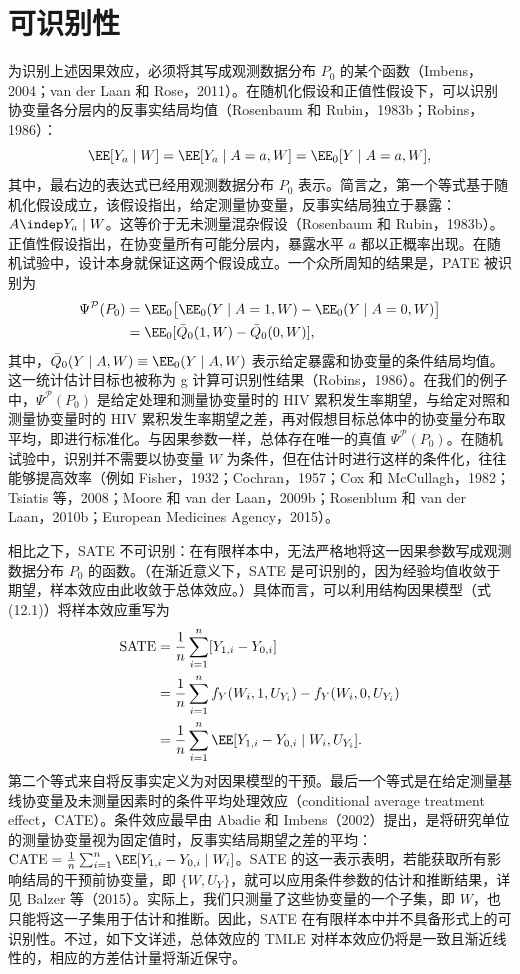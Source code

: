 \section{可识别性}

为识别上述因果效应，必须将其写成观测数据分布 $P_0$ 的某个函数（Imbens，2004；van der Laan 和 Rose，2011）。在随机化假设和正值性假设下，可以识别协变量各分层内的反事实结局均值（Rosenbaum 和 Rubin，1983b；Robins，1986）：
\[
\EE[Y_a\mid W]=\EE[Y_a\mid A=a,W]=\EE_0[Y\mid A=a,W],
\]
其中，最右边的表达式已经用观测数据分布 $P_0$ 表示。简言之，第一个等式基于随机化假设成立，该假设指出，给定测量协变量，反事实结局独立于暴露：$A\indep Y_a\mid W$。这等价于无未测量混杂假设（Rosenbaum 和 Rubin，1983b）。正值性假设指出，在协变量所有可能分层内，暴露水平 $a$ 都以正概率出现。在随机试验中，设计本身就保证这两个假设成立。一个众所周知的结果是，PATE 被识别为
\[
\begin{aligned}
\Psi^{\mathcal P}(P_0)
&=\EE_0\bigl[\EE_0(Y\mid A=1,W)-\EE_0(Y\mid A=0,W)\bigr]\\
&=\EE_0[\bar Q_0(1,W)-\bar Q_0(0,W)],
\end{aligned}
\]
其中，$\bar Q_0(Y\mid A,W)\equiv\EE_0(Y\mid A,W)$ 表示给定暴露和协变量的条件结局均值。这一统计估计目标也被称为 g 计算可识别性结果（Robins，1986）。在我们的例子中，$\Psi^{\mathcal P}(P_0)$ 是给定处理和测量协变量时的 HIV 累积发生率期望，与给定对照和测量协变量时的 HIV 累积发生率期望之差，再对假想目标总体中的协变量分布取平均，即进行标准化。与因果参数一样，总体存在唯一的真值 $\Psi^{\mathcal P}(P_0)$。在随机试验中，识别并不需要以协变量 $W$ 为条件，但在估计时进行这样的条件化，往往能够提高效率（例如 Fisher，1932；Cochran，1957；Cox 和 McCullagh，1982；Tsiatis 等，2008；Moore 和 van der Laan，2009b；Rosenblum 和 van der Laan，2010b；European Medicines Agency，2015）。

相比之下，SATE 不可识别：在有限样本中，无法严格地将这一因果参数写成观测数据分布 $P_0$ 的函数。（在渐近意义下，SATE 是可识别的，因为经验均值收敛于期望，样本效应由此收敛于总体效应。）具体而言，可以利用结构因果模型（式 (12.1)）将样本效应重写为
\[
\begin{aligned}
\mathrm{SATE}
&=\frac1n\sum_{i=1}^n[Y_{1,i}-Y_{0,i}]\\
&=\frac1n\sum_{i=1}^n f_Y(W_i,1,U_{Y_i})-f_Y(W_i,0,U_{Y_i})\\
&=\frac1n\sum_{i=1}^n\EE[Y_{1,i}-Y_{0,i}\mid W_i,U_{Y_i}].
\end{aligned}
\]
第二个等式来自将反事实定义为对因果模型的干预。最后一个等式是在给定测量基线协变量及未测量因素时的条件平均处理效应（conditional average treatment effect，CATE）。条件效应最早由 Abadie 和 Imbens（2002）提出，是将研究单位的测量协变量视为固定值时，反事实结局期望之差的平均：$\mathrm{CATE}=\frac1n\sum_{i=1}^n\EE[Y_{1,i}-Y_{0,i}\mid W_i]$。SATE 的这一表示表明，若能获取所有影响结局的干预前协变量，即 $\{W,U_Y\}$，就可以应用条件参数的估计和推断结果，详见 Balzer 等（2015）。实际上，我们只测量了这些协变量的一个子集，即 $W$，也只能将这一子集用于估计和推断。因此，SATE 在有限样本中并不具备形式上的可识别性。不过，如下文详述，总体效应的 TMLE 对样本效应仍将是一致且渐近线性的，相应的方差估计量将渐近保守。

